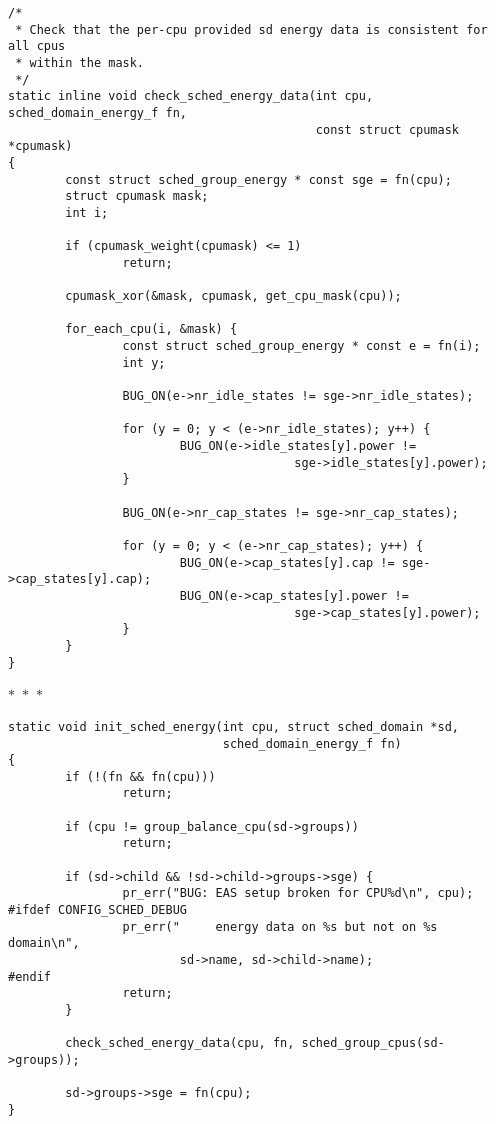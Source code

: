 \documentclass{article}
\newcommand{\divider}{{\begin{center}
  $\ast$~$\ast$~$\ast$
\end{center}}}
\begin{document}
\begin{verbatim}
/*
 * Check that the per-cpu provided sd energy data is consistent for all cpus
 * within the mask.
 */
static inline void check_sched_energy_data(int cpu, sched_domain_energy_f fn,
                                           const struct cpumask *cpumask)
{
        const struct sched_group_energy * const sge = fn(cpu);
        struct cpumask mask;
        int i;

        if (cpumask_weight(cpumask) <= 1)
                return;

        cpumask_xor(&mask, cpumask, get_cpu_mask(cpu));

        for_each_cpu(i, &mask) {
                const struct sched_group_energy * const e = fn(i);
                int y;

                BUG_ON(e->nr_idle_states != sge->nr_idle_states);

                for (y = 0; y < (e->nr_idle_states); y++) {
                        BUG_ON(e->idle_states[y].power !=
                                        sge->idle_states[y].power);
                }

                BUG_ON(e->nr_cap_states != sge->nr_cap_states);

                for (y = 0; y < (e->nr_cap_states); y++) {
                        BUG_ON(e->cap_states[y].cap != sge->cap_states[y].cap);
                        BUG_ON(e->cap_states[y].power !=
                                        sge->cap_states[y].power);
                }
        }
}
\end{verbatim}
\divider
\begin{verbatim}
static void init_sched_energy(int cpu, struct sched_domain *sd,
                              sched_domain_energy_f fn)
{
        if (!(fn && fn(cpu)))
                return;

        if (cpu != group_balance_cpu(sd->groups))
                return;

        if (sd->child && !sd->child->groups->sge) {
                pr_err("BUG: EAS setup broken for CPU%d\n", cpu);
#ifdef CONFIG_SCHED_DEBUG
                pr_err("     energy data on %s but not on %s domain\n",
                        sd->name, sd->child->name);
#endif
                return;
        }

        check_sched_energy_data(cpu, fn, sched_group_cpus(sd->groups));

        sd->groups->sge = fn(cpu);
}
\end{verbatim}
\end{document}
